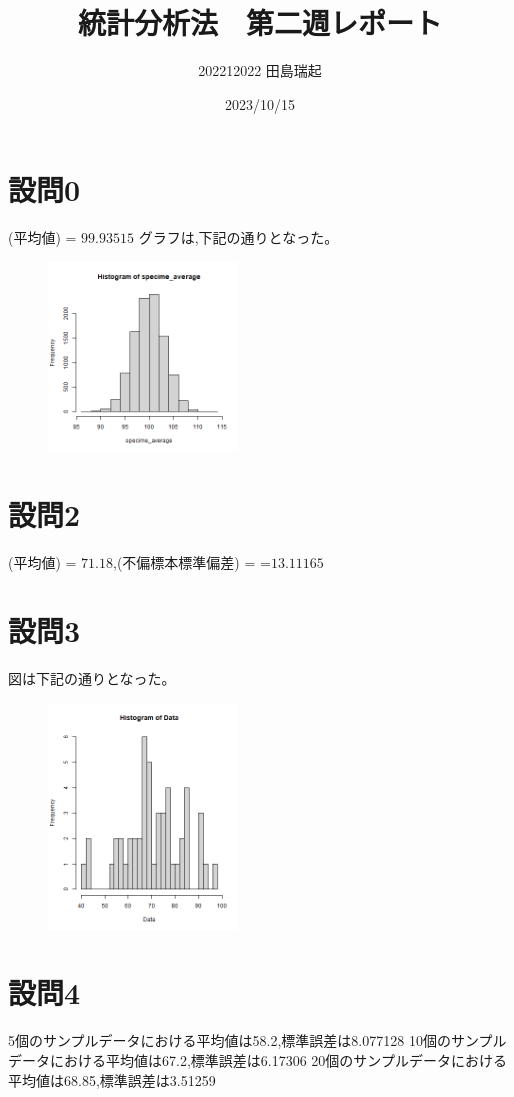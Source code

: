 \documentclass[fontsize = 10pt, paper= a4,twocolumn,column_gap=5zw]{jlreq}
\begin{document}
\title{統計分析法　第二週レポート}
\author{202212022 田島瑞起}
\date{2023/10/15}
\maketitle
\section{設問0}
(平均値) = $99.93515$
グラフは,下記の通りとなった。
\begin{figure}
    \centering
    \includegraphics[width=5cm]{kadai0.png}
\end{figure}

\section{設問2}
(平均値) = $71.18$,(不偏標本標準偏差) =  =$13.11165$

\section{設問3}
図は下記の通りとなった。
\begin{figure}
    \centering
    \includegraphics[width=5cm]{kadai3.png}
\end{figure}

\section{設問4}
5個のサンプルデータにおける平均値は58.2,標準誤差は8.077128
10個のサンプルデータにおける平均値は67.2,標準誤差は6.17306
20個のサンプルデータにおける平均値は68.85,標準誤差は3.51259
\end{document}
